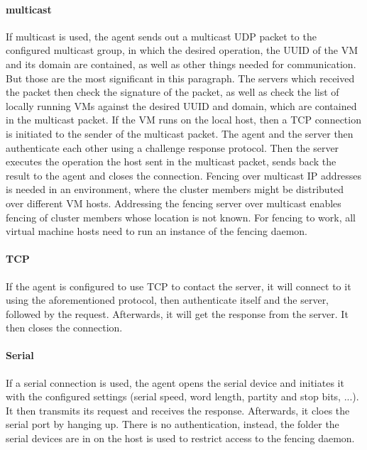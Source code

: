 \paragraph{multicast}
If multicast is used, the agent sends out a multicast UDP packet
to the configured multicast group, in which the desired operation, the \ac{UUID}
of the \ac{VM} and its domain are contained, as well as other things needed
for communication. But those are the most significant in this paragraph.
The servers which received the packet then check the signature
of the packet, as well as check the list of locally running \acp{VM} against 
the desired \ac{UUID} and domain, which are contained in the multicast packet.
If the \ac{VM} runs on the local host, then a \ac{TCP} connection
is initiated to the sender of the multicast packet. The agent
and the server then authenticate each other using a challenge response protocol.
Then the server executes the operation the host sent in the multicast packet,
sends back the result to the agent and closes the connection.
Fencing over multicast IP addresses is needed in an environment, where the cluster members might
be distributed over different \ac{VM} hosts. Addressing the fencing server
over multicast enables fencing of cluster members whose location is not known.
For fencing to work, all virtual machine hosts need to run an instance of
the fencing daemon.
\paragraph{TCP}
If the agent is configured to use \ac{TCP} to contact the server,
it will connect to it using the aforementioned protocol, then authenticate itself and the server,
followed by the request. Afterwards, it will get the response from the server. It
then closes the connection.
\paragraph{Serial}
If a serial connection is used, the agent opens the serial device and initiates it with the
configured settings (serial speed, word length, partity and stop bits, ...).
It then transmits its request and receives the response. Afterwards, it cloes the
serial port by hanging up.
There is no authentication, instead, the folder the serial devices are in on the host
is used to restrict access to the fencing daemon.
